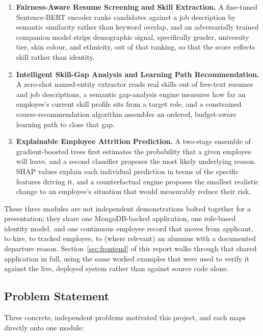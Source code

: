 \documentclass[11pt,a4paper]{article}
\begin{document}
\begin{enumerate}[label=\textbf{Module \arabic*.}, leftmargin=2.6cm]
  \item \textbf{Fairness-Aware Resume Screening and Skill Extraction.} A fine-tuned Sentence-BERT encoder ranks candidates against a job description by semantic similarity rather than keyword overlap, and an adversarially trained companion model strips demographic signal, specifically gender, university tier, skin colour, and ethnicity, out of that ranking, so that the score reflects skill rather than identity.
  \item \textbf{Intelligent Skill-Gap Analysis and Learning Path Recommendation.} A zero-shot named-entity extractor reads real skills out of free-text resumes and job descriptions, a semantic gap-analysis engine measures how far an employee's current skill profile sits from a target role, and a constrained course-recommendation algorithm assembles an ordered, budget-aware learning path to close that gap.
  \item \textbf{Explainable Employee Attrition Prediction.} A two-stage ensemble of gradient-boosted trees first estimates the probability that a given employee will leave, and a second classifier proposes the most likely underlying reason. SHAP values explain each individual prediction in terms of the specific features driving it, and a counterfactual engine proposes the smallest realistic change to an employee's situation that would measurably reduce their risk.
\end{enumerate}

These three modules are not independent demonstrations bolted together for a presentation; they share one MongoDB-backed application, one role-based identity model, and one continuous employee record that moves from applicant, to hire, to tracked employee, to (where relevant) an alumnus with a documented departure reason. Section~\ref{sec:frontend} of this report walks through that shared application in full, using the same worked examples that were used to verify it against the live, deployed system rather than against source code alone.

\subsection{Problem Statement}

Three concrete, independent problems motivated this project, and each maps directly onto one module:
\end{document}
